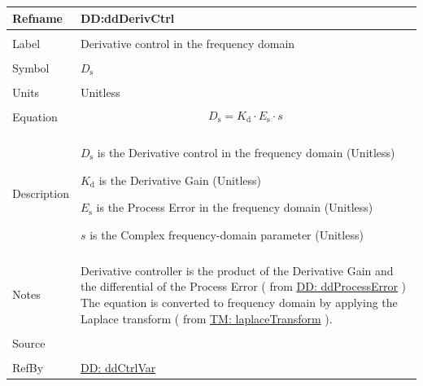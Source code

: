 \documentclass[12pt]{article}
\begin{document}
\vspace{\baselineskip}
\noindent
\begin{minipage}{\textwidth}
\begin{tabular}{>{\raggedright}p{}>{\raggedright\arraybackslash}p{}}
\toprule \textbf{Refname} & \textbf{DD:ddDerivCtrl}
\label{DD:ddDerivCtrl}
\\ \midrule \\
Label & Derivative control in the frequency domain
        
\\ \midrule \\
Symbol & ${D_{\text{s}}}$
         
\\ \midrule \\
Units & Unitless
        
\\ \midrule \\
Equation & \begin{displaymath}
           {D_{\text{s}}}={K_{\text{d}}}\cdot{}{E_{\text{s}}}\cdot{}s
           \end{displaymath}
\\ \midrule \\
Description & \begin{symbDescription}
              \item{${D_{\text{s}}}$ is the Derivative control in the frequency domain (Unitless)}
              \item{${K_{\text{d}}}$ is the Derivative Gain (Unitless)}
              \item{${E_{\text{s}}}$ is the Process Error in the frequency domain (Unitless)}
              \item{$s$ is the Complex frequency-domain parameter (Unitless)}
              \end{symbDescription}
\\ \midrule \\
Notes & Derivative controller is the product of the Derivative Gain and the differential of the Process Error ( from  \hyperref[DD:ddProcessError]{DD: ddProcessError} ) The equation is converted to frequency domain by applying the Laplace transform ( from \hyperref[TM:laplaceTransform]{TM: laplaceTransform} ).
        
\\ \midrule \\
Source & \cite{johnson2008}
         
\\ \midrule \\
RefBy & \hyperref[DD:ddCtrlVar]{DD: ddCtrlVar}
        
\\ \bottomrule
\end{tabular}
\end{minipage}
\end{document}

